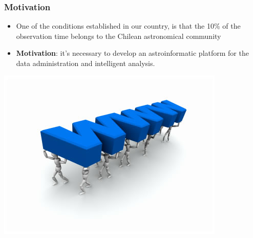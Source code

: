 \begin{frame}
\frametitle{Motivation}

\begin{itemize}
	\item One of the conditions established in our country, is that the 10\% of the observation
		time belongs to the Chilean astronomical community
	\item \textbf{Motivation}: it's necessary to develop an astroinformatic platform for the data administration
		and intelligent analysis.
\end{itemize}

\begin{center}
\includegraphics[height=0.3\textheight]{img/platform}
\end{center}


\end{frame}
